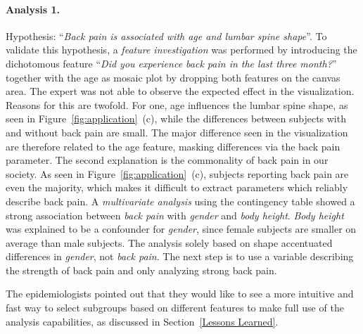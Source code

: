 \documentclass[journal]{style/vgtc} 			          %
\begin{document}
\paragraph{Analysis 1.}
Hypothesis: ``\emph{Back pain is associated with age and lumbar spine shape}''.
%
To validate this hypothesis, a \emph{feature investigation} was performed by introducing the dichotomous feature ``\emph{Did you experience back pain in the last three month?}'' together with the age as mosaic plot by dropping both features on the canvas area.
%
The expert was not able to observe the expected effect in the visualization.
%
Reasons for this are twofold.
%
For one, age influences the lumbar spine shape, as seen in Figure~\ref{fig:application}~(c), while the differences between subjects with and without back pain are small.
%
The major difference seen in the visualization are therefore related to the age feature, masking differences via the back pain parameter.
%
The second explanation is the commonality of back pain in our society.
%
As seen in Figure~\ref{fig:application}~(c), subjects reporting back pain are even the majority, which makes it difficult to extract parameters which reliably describe back pain.
%
A \emph{multivariate analysis} using the contingency table showed a strong association between \emph{back pain} with \emph{gender} and \emph{body height}.
%
\emph{Body height} was explained to be a confounder for \emph{gender}, since female subjects are smaller on average than male subjects.
%
The analysis solely based on shape accentuated differences in \emph{gender}, not \emph{back pain}.
%
The next step is to use a variable describing the strength of back pain and only analyzing strong back pain.

The epidemiologists pointed out that they would like to see a more intuitive and fast way to select subgroups based on different features to make full use of the analysis capabilities, as discussed in Section~\ref{Lessons Learned}.
\end{document}
